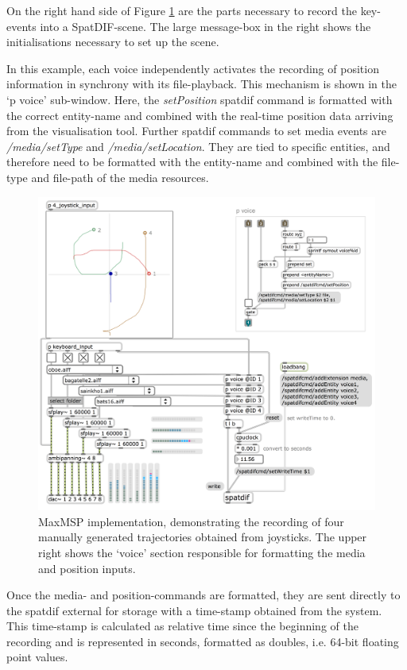 \documentclass{article}
\begin{document}
On the right hand side of Figure \ref{fig:screenshot2} are the parts necessary to record the key-events into a SpatDIF-scene.
The large message-box in the right shows the initialisations necessary to set up the scene.

In this example, each voice independently activates the recording of position information in synchrony with its file-playback.
This mechanism is shown in the `p voice' sub-window. 
Here, the \emph{setPosition} spatdif command is formatted with the correct entity-name and combined with the real-time position data arriving from the visualisation tool.
Further spatdif commands to set media events are \emph{/media/setType} and \emph{/media/setLocation}.
They are tied to specific entities, and therefore need to be formatted with the entity-name and combined with the file-type and file-path of the media resources.

\begin{figure}[httb]
	\centering
	\includegraphics[width=\columnwidth]{recording_maxpatch.png}
	\caption{MaxMSP implementation, demonstrating the recording of four manually generated trajectories obtained from joysticks. The upper right shows the `voice' section responsible for formatting the media and position inputs.} 
	\label{fig:screenshot2}
\end{figure}

Once the media- and position-commands are formatted, they are sent directly to the spatdif external for storage with a time-stamp obtained from the system.
This time-stamp is calculated as relative time since the beginning of the recording and is represented in seconds, formatted as doubles, i.e. 64-bit floating point values.
\end{document}
